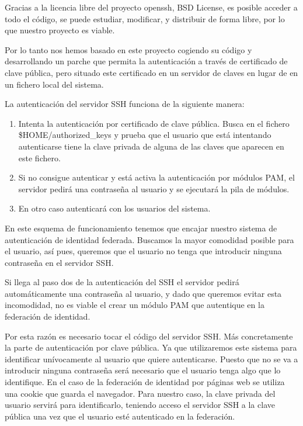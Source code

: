     Gracias a la licencia libre del proyecto openssh, BSD License, es
    posible acceder a todo el código, se puede estudiar, modificar, y
    distribuir de forma libre, por lo que nuestro proyecto es viable.

    Por lo tanto nos hemos basado en este proyecto cogiendo su código y
    desarrollando un parche que permita la autenticación a través de
    certificado de clave pública, pero situado este certificado en un
    servidor de claves en lugar de en un fichero local del sistema.

    La autenticación del servidor SSH funciona de la siguiente manera:

    \begin{enumerate}

    \item Intenta la autenticación por certificado de clave pública. Busca
    en el fichero \$HOME/authorized\_keys y prueba que el usuario que está
    intentando autenticarse tiene la clave privada de alguna de las claves
    que aparecen en este fichero.

    \item Si no consigue autenticar y está activa la autenticación por
    módulos PAM, el servidor pedirá una contraseña al usuario y se
    ejecutará la pila de módulos.

    \item En otro caso autenticará con los usuarios del sistema.

    \end{enumerate}

    En este esquema de funcionamiento tenemos que encajar nuestro sistema
    de autenticación de identidad federada. Buscamos la mayor comodidad
    posible para el usuario, así pues, queremos que el usuario no tenga que
    introducir ninguna contraseña en el servidor SSH.

    Si llega al paso dos de la autenticación del SSH el servidor pedirá
    automáticamente una contraseña al usuario, y dado que queremos evitar
    esta incomodidad, no es viable el crear un módulo PAM que autentique
    en la federación de identidad.

    Por esta razón es necesario tocar el código del servidor SSH. Más
    concretamente la parte de autenticación por clave pública. Ya que
    utilizaremos este sistema para identificar unívocamente al usuario que
    quiere autenticarse. Puesto que no se va a introducir ninguna contraseña
    será necesario que el usuario tenga algo que lo identifique. En el caso
    de la federación de identidad por páginas web se utiliza una cookie
    que guarda el navegador. Para nuestro caso, la clave privada del
    usuario servirá para identificarlo, teniendo acceso el servidor SSH a
    la clave pública una vez que el usuario esté autenticado en la
    federación.

